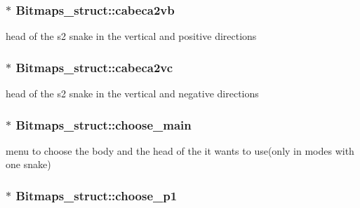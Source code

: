 \subsubsection[{\texorpdfstring{cabeca2vb}{cabeca2vb}}]{$\ast$ Bitmaps\+\_\+struct\+::cabeca2vb}\hypertarget{group__graphics_ga50f31017797fe46247d3ef644f6670c9}{}\label{group__graphics_ga50f31017797fe46247d3ef644f6670c9}


head of the s2 snake in the vertical and positive directions 

\subsubsection[{\texorpdfstring{cabeca2vc}{cabeca2vc}}]{$\ast$ Bitmaps\+\_\+struct\+::cabeca2vc}\hypertarget{group__graphics_gabcbbaac60aafd8e9549fcef5fa6acb83}{}\label{group__graphics_gabcbbaac60aafd8e9549fcef5fa6acb83}


head of the s2 snake in the vertical and negative directions 

\subsubsection[{\texorpdfstring{choose\+\_\+main}{choose_main}}]{$\ast$ Bitmaps\+\_\+struct\+::choose\+\_\+main}\hypertarget{group__graphics_ga0fe961b9b328a12b933b0e3d2393e9d4}{}\label{group__graphics_ga0fe961b9b328a12b933b0e3d2393e9d4}


menu to choose the body and the head of the it wants to use(only in modes with one snake) 

\subsubsection[{\texorpdfstring{choose\+\_\+p1}{choose_p1}}]{$\ast$ Bitmaps\+\_\+struct\+::choose\+\_\+p1}\hypertarget{group__graphics_ga1c051bf49f7de6f60eb93649684ebfb5}{}\label{group__graphics_ga1c051bf49f7de6f60eb93649684ebfb5}


